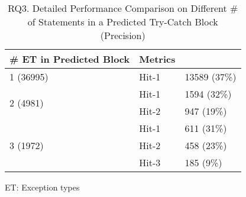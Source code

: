 \begin{table}[t]
	\caption{RQ3. Detailed Performance Comparison on Different \# of Statements in a Predicted Try-Catch Block (Precision)}
	\vspace{-10pt}
	\tabcolsep 2pt
	{\small
		\begin{center}
			\renewcommand{\arraystretch}{1}
			\begin{tabular}{p{3cm}<{\centering}|p{2cm}<{\centering}|p{2cm}<{\centering}}
				\hline
				\# ET in Predicted Block & Metrics & {\textsc{\tool}\xspace} \\
				\hline
				\multirow{1}{*}{1 (36995)}   & Hit-1  & 13589 (37\%) \\
				\hline
				\multirow{2}{*}{2 (4981)}  & Hit-1   & 1594 (32\%) \\
				& Hit-2       						& 947 (19\%) \\
				\hline
				\multirow{3}{*}{3 (1972)}  & Hit-1    & 611 (31\%) \\
				& Hit-2         					& 458 (23\%)\\
				& Hit-3         				  	& 185 (9\%) \\
				\hline
			\end{tabular}
		ET: Exception types
			\label{RQ3_results_2}
		\end{center}
	}
\end{table}